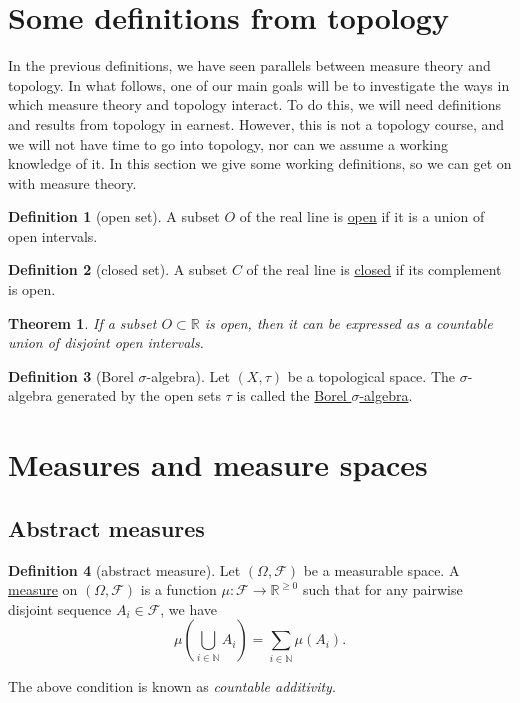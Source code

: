 \documentclass[a4paper,12pt]{scrreprt}
\newcommand{\R}{\mathbb{R}}
\newcommand{\N}{\mathbb{N}}
\newcommand{\defn}[1]{\ul{#1}}
\theoremstyle{definition}
\newtheorem{definition}{Definition}[section]
\theoremstyle{plain}
\newtheorem{theorem}{Theorem}[section]
\theoremstyle{remark}
\begin{document}
\section{Some definitions from topology}
In the previous definitions, we have seen parallels between measure theory and topology. In what follows, one of our main goals will be to investigate the ways in which measure theory and topology interact. To do this, we will need definitions and results from topology in earnest. However, this is not a topology course, and we will not have time to go into topology, nor can we assume a working knowledge of it. In this section we give some working definitions, so we can get on with measure theory.

\begin{definition}[open set]
  \label{def:openset}
  A subset $O$ of the real line is \defn{open} if it is a union of open intervals.
\end{definition}

\begin{definition}[closed set]
  \label{def:closedset}
  A subset $C$ of the real line is \defn{closed} if its complement is open.
\end{definition}

\begin{theorem}
  If a subset $O \subset \R$ is open, then it can be expressed as a countable union of disjoint open intervals.
\end{theorem}

\begin{definition}[Borel $\sigma$-algebra]
  \label{def:borelsigmaalgebra}
  Let $(X, \tau)$ be a topological space. The $\sigma$-algebra generated by the open sets $\tau$ is called the \defn{Borel $\sigma$-algebra}.
\end{definition}

\section{Measures and measure spaces}
\subsection{Abstract measures}
\begin{definition}[abstract measure]
  \label{def:abstractmeasure}
  Let $(\Omega, \mathcal{F})$ be a measurable space. A \defn{measure} on $(\Omega, \mathcal{F})$ is a function $\mu\colon \mathcal{F} \to \R^{\geq 0}$ such that for any pairwise disjoint sequence $A_{i} \in \mathcal{F}$, we have
  \begin{equation*}
    \mu\left( \bigcup_{i \in \N} A_{i} \right) = \sum_{i \in \N} \mu(A_{i}).
  \end{equation*}

  The above condition is known as \emph{countable additivity}.
\end{definition}
\end{document}
